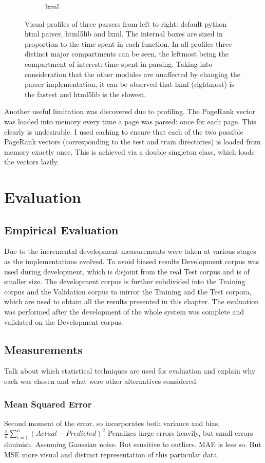 \documentclass[12pt,notitlepage,twoside]{scrreprt}
\begin{document}
\begin{figure}[h!]
\begin{subfigure}[b]{.3\textwidth}
  \caption{lxml}
  \label{lxml}
\end{subfigure}
\caption{Visual profiles of three parsers from left to right: default python
html parser, html5lib and lxml. The internal boxes are sized in proportion to
the time spent in each function. In all profiles three distinct major
compartments can be seen, the leftmost being the compartment of interest: 
time spent in parsing. Taking into consideration that the other modules are unaffected by changing the parser
implementation, it can be observed that lxml (rightmost) is the fastest and
html5lib is the slowest.\label{parsers}}
\end{figure}

Another useful limitation was discovered due to profiling. The PageRank vector
was loaded into memory every time a page was parsed: once for each page. This
clearly is undesirable. I used caching to ensure that each of the two possible
PageRank vectors (corresponding to the test and train directories) is loaded
from memory exactly once. This is achieved via a double singleton class, which
loads the vectors lazily.

\cleardoublepage

\chapter{Evaluation}
\section{Empirical Evaluation}
Due to the incremental development measurements were taken at various stages as
the implementations evolved. To avoid biased results Development corpus was
used during development, which is disjoint from the real Test corpus and is of
smaller size. The development corpus is further subdivided into the Training
corpus and the Validation corpus to mirror the Training and the Test corpora,
which are used to obtain all the results presented in this chapter.
The evaluation was performed after the development of the whole system was
complete and validated on the Development corpus.

\section{Measurements}
Talk about which statistical techniques are used for evaluation and explain why each was
chosen and what were other alternatives considered.

\subsection{Mean Squared Error}
Second moment of the error, so incorporates both variance and bias.
\(\frac{1}{n}\sum_{i=1}^n(Actual-Predicted)^2\) Penalizes large errors heavily, but small
errors diminish.
Assuming Gaussian noise. But sensitive to outliers. MAE is less so. But MSE more visual
and distinct representation of this particular data.
\end{document}
